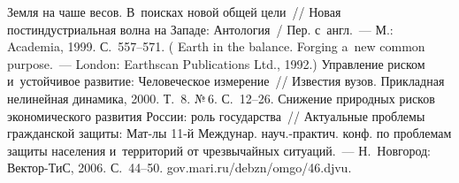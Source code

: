 \begin{multicols}{2}
{\small\frenchspacing
 {%
 \begin{thebibliography}{99}
 
 Земля на чаше весов. В~по\-ис\-ках новой об\-щей цели~// Новая 
пост\-ин\-ду\-стри\-аль\-ная волна на Западе: Антология~/ Пер. с~англ.~--- М.: 
Academia, 1999. С.~557--571. ( Earth in the balance. Forging a~new 
common purpose.~--- London: Earthscan Publications Ltd., 1992.)
 Управ\-ле\-ние рис\-ком 
и~устойчивое развитие: Человеческое измерение~// Известия вузов. 
Прикладная нелинейная динамика, 2000. Т.~8. №\,6. С.~12--26.
 Снижение природных рис\-ков экономического развития 
России: роль государства~// Актуальные проб\-ле\-мы гражданской защиты:  
Мат-лы 11-й Междунар. науч.-практич. конф. по проб\-ле\-мам защиты 
населения и~территорий от чрезвычайных ситуаций.~--- 
Н.~Новгород: Вектор-ТиС, 2006. С.~44--50. {\sf 
gov.mari.ru/debzn/omgo/46.djvu}.


\end{thebibliography}}}
\end{multicols}
